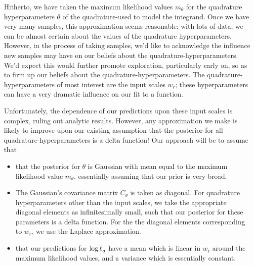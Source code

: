 \documentclass{article}
\begin{document}
Hitherto, we have taken the maximum likelihood values $m_\theta$ for the quadrature hyperparameters $\theta$ of the quadrature-\gpb used to model the integrand. Once we have very many samples, this approximation seems reasonable: with lots of data, we can be almost certain about the values of the quadrature hyperparameters. However, in the process of taking samples, we'd like to acknowledge the influence new samples may have on our beliefs about the quadrature-hyperparameters. We'd expect this would further promote exploration, particularly early on, so as to firm up our beliefs about the quadrature-hyperparameters. The quadrature-hyperparameters of most interest are the input scales $w_r$; these hyperparameters can have a very dramatic influence on our fit to a function.


Unfortunately, the dependence of our predictions upon these input scales is complex, ruling out analytic results. However, any approximation we make is likely to improve upon our existing assumption that the posterior for all quadrature-hyperparameters is a delta function! Our approach will be to assume that
\begin{itemize}
 \item that the posterior for $\theta$ is Gaussian with mean equal to the maximum likelihood value $m_\theta$, essentially assuming that our prior is very broad. 
\item The Gaussian's covariance matrix $C_\theta$ is taken as diagonal. For quadrature hyperparameters other than the input scales, we take the appropriate diagonal elements as infinitesimally small, such that our posterior for these parameters is a delta function. For the the diagonal elements corresponding to $w_r$, we use the Laplace approximation.
\item that our predictions for $\tr_a$ have a mean which is linear in $w_r$ around the maximum likelihood values, and a variance which is essentially constant.  
\end{itemize}
 
\end{document}
